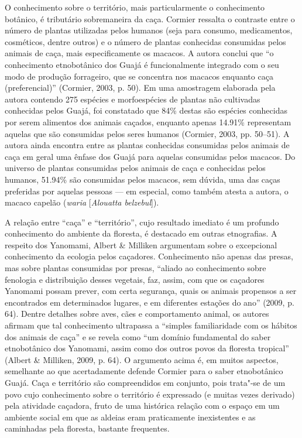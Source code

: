 O conhecimento sobre o território, mais particularmente o conhecimento
botânico, é tributário sobremaneira da caça. Cormier ressalta o
contraste entre o número de plantas utilizadas pelos humanos (seja para
consumo, medicamentos, cosméticos, dentre outros) e o número de plantas
conhecidas consumidas pelos animais de caça, mais especificamente os
macacos. A autora conclui que ``o conhecimento etnobotânico dos Guajá é
funcionalmente integrado com o seu modo de produção forrageiro, que se
concentra nos macacos enquanto caça (preferencial)'' (Cormier, 2003,
p. 50). Em uma amostragem elaborada pela autora contendo 275 espécies e
morfoespécies de plantas não cultivadas conhecidas pelos Guajá, foi
constatado que 84\% destas são espécies conhecidas por serem alimentos
dos animais caçados, enquanto apenas 14.91\% representam aquelas que são
consumidas pelos seres humanos (Cormier, 2003, pp. 50--51). A autora ainda
encontra entre as plantas conhecidas consumidas pelos animais de caça em
geral uma ênfase dos Guajá para aquelas consumidas pelos macacos. Do
universo de plantas consumidas pelos animais de caça e conhecidas pelos
humanos, 51.94\% são consumidas pelos macacos, sem dúvida, uma das caças
preferidas por aquelas pessoas --- em especial, como também atesta a
autora, o macaco capelão (\emph{waria} {[}\emph{Alouatta belzebul}{]}).

A relação entre ``caça'' e ``território'', cujo resultado imediato é um
profundo conhecimento do ambiente da floresta, é destacado em outras
etnografias. A respeito dos Yanomami, Albert \& Milliken argumentam
sobre o excepcional conhecimento da ecologia pelos caçadores.
Conhecimento não apenas das presas, mas sobre plantas consumidas por
presas, ``aliado ao conhecimento sobre fenologia e distribuição desses
vegetais, faz, assim, com que os caçadores Yanomami possam prever, com
certa segurança, quais os animais propensos a ser encontrados em
determinados lugares, e em diferentes estações do ano'' (2009, p. 64).
Dentre detalhes sobre aves, cães e comportamento animal, os autores
afirmam que tal conhecimento ultrapassa a ``simples familiaridade com os
hábitos dos animais de caça'' e se revela como ``um domínio fundamental
do saber etnobotânico dos Yanomami, assim como dos outros povos da
floresta tropical'' (Albert \& Milliken, 2009, p. 64). O argumento acima
é, em muitos aspectos, semelhante ao que acertadamente defende Cormier
para o saber etnobotânico Guajá. Caça e território são compreendidos em
conjunto, pois trata"-se de um povo cujo conhecimento sobre o território
é expressado (e muitas vezes derivado) pela atividade caçadora, fruto de
uma histórica relação com o espaço em um ambiente social em que as
aldeias eram praticamente inexistentes e as caminhadas pela floresta,
bastante frequentes.

